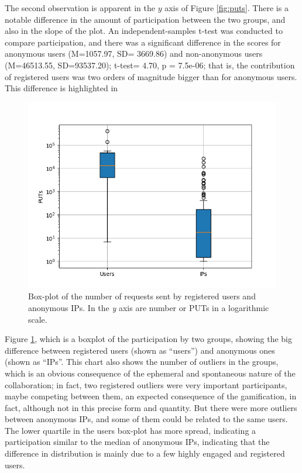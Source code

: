 \documentclass{llncs}
\begin{document}
The second observation is apparent in the $y$ axis of Figure
\ref{fig:puts}. There is a notable difference in the amount of
participation between the two groups, and also in the slope of the
plot.  An independent-samples t-test was conducted to compare
participation, and there was a significant difference in the scores
for anonymous users  (M=1057.97, SD= 3669.86) and non-anonymous users
(M=46513.55, SD=93537.20); t-test= 4.70, p = 7.5e-06; that is, the
contribution of registered users was two orders of magnitude bigger
than for anonymous users. This difference is highlighted in 
%
%
%           
%
%
\begin{figure}[htb]
    \centering
        \includegraphics[width=5in]{img/puts_box.png}
    \caption{Box-plot of the number of requests sent by registered users and anonymous IPs.
     In the \emph{y} axis are number or PUTs in a logarithmic scale.
    }
    \label{fig:box}
\end{figure}
%
 Figure \ref{fig:box}, which is a boxplot of the  participation by two
 groups, showing the big difference between registered users (shown as
 ``users'') and anonymous ones (shown as ``IPs''. This chart also
 shows the number of outliers in the groups, which is an obvious
 consequence of the ephemeral and spontaneous nature of the
 collaboration; in fact, two registered
outliers were very important participants, maybe competing between
them, an expected consequence of the gamification, in fact, although
not in this precise form and quantity. But
there were more outliers between anonymous IPs, and some of them could
be related to the same users. The lower quartile in the users box-plot
has more 
spread, indicating a participation similar to the median of anonymous
IPs, indicating that the difference in distribution is mainly due to a
few highly engaged and registered users. 
\end{document}
